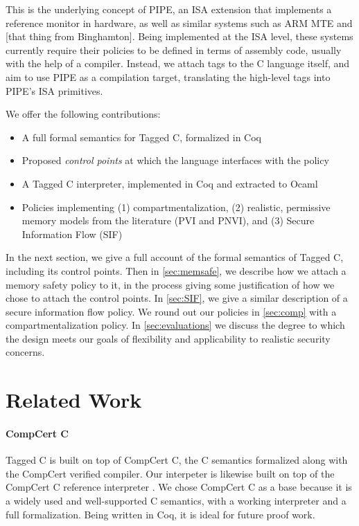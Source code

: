 \documentclass[acmsmall,review,anonymous]{acmart}\settopmatter{printfolios=true,printccs=false,printacmref=false}
\begin{document}
This is the underlying concept of PIPE, an ISA extension that implements a reference monitor in
hardware, as well as similar systems such as ARM MTE and [that thing from Binghamton]. Being
implemented at the ISA level, these systems currently require their policies to be defined in terms of
assembly code, usually with the help of a compiler. Instead, we attach tags to the C language
itself, and aim to use PIPE as a compilation target, translating the high-level tags into
PIPE's ISA primitives.

We offer the following contributions:

\begin{itemize}
\item A full formal semantics for Tagged C, formalized in Coq
\item Proposed {\em control points} at which the language interfaces with the policy
\item A Tagged C interpreter, implemented in Coq and extracted to Ocaml
\item Policies implementing (1) compartmentalization,
  (2) realistic, permissive memory models from the literature (PVI and PNVI),
  and (3) Secure Information Flow (SIF)
\end{itemize}

In the next section, we give a full account of the formal semantics of Tagged C,
including its control points. Then in \cref{sec:memsafe}, we describe how we attach
a memory safety policy to it, in the process giving some justification of how we chose to
attach the control points. In \cref{sec:SIF}, we give a similar description of
a secure information flow policy. We round out our policies in \cref{sec:comp} with
a compartmentalization policy. In \cref{sec:evaluations} we discuss the degree to
which the design meets our goals of flexibility and applicability to realistic
security concerns.

\section{Related Work}

\paragraph{CompCert C}

Tagged C is built on top of CompCert C, the C semantics formalized along with the CompCert verified compiler.
Our interpeter is likewise built on top of the CompCert C reference interpreter \cite{Leroy09:CompCert}.
We chose CompCert C as a base because it is a widely used and well-supported C semantics, with a working
interpreter and a full formalization. Being written in Coq, it is ideal for future proof work.
\end{document}
